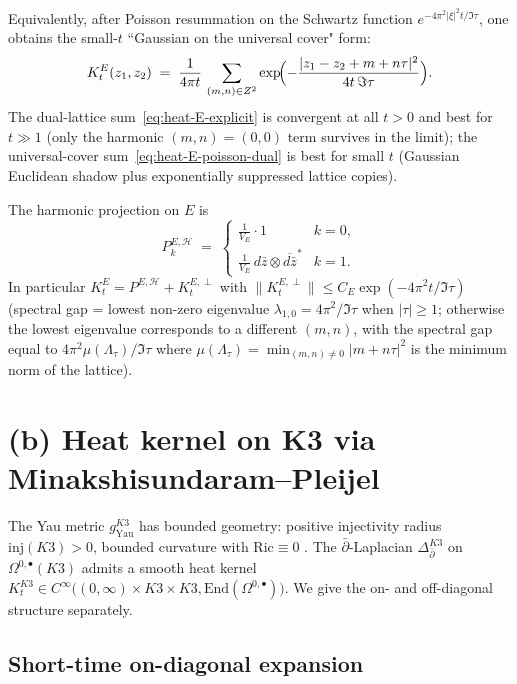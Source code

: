 \documentclass[11pt]{amsart}
\providecommand{\dbar}{\bar\partial}
\providecommand{\Z}{\mathbb{Z}}
\theoremstyle{definition}
\theoremstyle{remark}
\begin{document}
Equivalently, after Poisson resummation on the Schwartz function
$e^{-4\pi^2 |\xi|^2 t/\Im\tau}$, one obtains the small-$t$ ``Gaussian
on the universal cover" form:
\begin{equation}
  \label{eq:heat-E-poisson-dual}
  K^E_t(z_1,z_2)
  \;=\;
  \frac{1}{4\pi t}\,
  \sum_{(m,n) \in \Z^2}
  \exp\!\Bigl(-\frac{|z_1 - z_2 + m + n\tau|^2}{4 t\,\Im\tau}\Bigr).
\end{equation}
The dual-lattice sum~\eqref{eq:heat-E-explicit} is convergent at
all $t > 0$ and best for $t \gg 1$ (only the harmonic
$(m,n)=(0,0)$ term survives in the limit); the universal-cover
sum~\eqref{eq:heat-E-poisson-dual} is best for small $t$ (Gaussian
Euclidean shadow plus exponentially suppressed lattice copies).

The harmonic projection on $E$ is
\[
  P^{E,\mathcal H}_k
  \;=\; \begin{cases}
    \frac{1}{V_E} \cdot 1 & k = 0, \\[2pt]
    \frac{1}{V_E}\,d\bar z \otimes \overline{d\bar z}^* & k = 1.
  \end{cases}
\]
In particular $K^E_t = P^{E,\mathcal H} + K^{E,\perp}_t$ with
$\|K^{E,\perp}_t\| \leq C_E \exp(-4\pi^2 t/\Im\tau)$
(spectral gap = lowest non-zero eigenvalue
$\lambda_{1,0} = 4\pi^2/\Im\tau$ when $|\tau| \geq 1$;
otherwise the lowest eigenvalue corresponds to a different
$(m,n)$, with the spectral gap equal to
$4\pi^2 \mu(\Lambda_\tau)/\Im\tau$ where
$\mu(\Lambda_\tau) = \min_{(m,n) \neq 0} |m+n\tau|^2$ is the
minimum norm of the lattice).

\section{(b) Heat kernel on K3 via Minakshisundaram--Pleijel}
\label{sec:heat-K3}

The Yau metric $g^{K3}_{\mathrm{Yau}}$ has bounded geometry: positive
injectivity radius $\mathrm{inj}(K3) > 0$, bounded curvature with
$\mathrm{Ric}\equiv 0$ \cite{Yau1978}. The $\dbar$-Laplacian
$\Delta_{\dbar}^{K3}$ on $\Omega^{0,\bullet}(K3)$ admits a smooth
heat kernel $K^{K3}_t \in C^\infty\bigl((0,\infty)\times K3\times K3,
\mathrm{End}(\Omega^{0,\bullet})\bigr)$. We give the on- and
off-diagonal structure separately.

\subsection{Short-time on-diagonal expansion}
\end{document}
